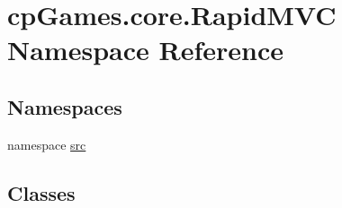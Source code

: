 \hypertarget{namespacecp_games_1_1core_1_1_rapid_m_v_c}{}\section{cp\+Games.\+core.\+Rapid\+M\+VC Namespace Reference}
\label{namespacecp_games_1_1core_1_1_rapid_m_v_c}
\subsection*{Namespaces}
\begin{DoxyCompactItemize}
\item 
namespace \mbox{\hyperlink{namespacecp_games_1_1core_1_1_rapid_m_v_c_1_1src}{src}}
\end{DoxyCompactItemize}
\subsection*{Classes}
